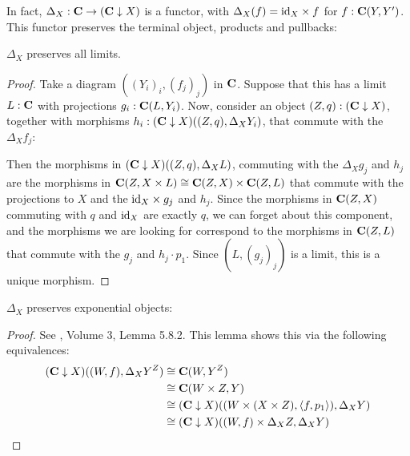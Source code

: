 In fact, $ \Delta_X : \mathbf{C} \to (\mathbf{C} \downarrow X) $ is a functor, with $ \Delta_X(f) = \text{id}_{X} \times f $ for $ f: \mathbf{C}(Y, Y^\prime) $. This functor preserves the terminal object, products and pullbacks:
\begin{lemma}\label{lem:delta-limits}
  $ \Delta_X $ preserves all limits.
\end{lemma}
\begin{proof}
  Take a diagram $ ((Y_i)_i, (f_j)_j) $ in $ \mathbf{C} $. Suppose that this has a limit $ L : \mathbf{C} $ with projections $ g_i : \mathbf{C}(L, Y_i) $. Now, consider an object $ (Z, q) : (\mathbf{C} \downarrow X) $, together with morphisms $ h_i : (\mathbf{C} \downarrow X)((Z, q), \Delta_X Y_i) $, that commute with the $ \Delta_X f_j $:
  \begin{center}
  \end{center}
  Then the morphisms in $ (\mathbf{C} \downarrow X)((Z, q), \Delta_X L) $, commuting with the $ \Delta_X g_j $ and $ h_j $ are the morphisms in $ \mathbf{C}(Z, X \times L) \cong \mathbf{C}(Z, X) \times \mathbf{C}(Z, L) $ that commute with the projections to $ X $ and the $ \text{id}_{X} \times g_j $ and $ h_j $. Since the morphisms in $ \mathbf{C}(Z, X) $ commuting with $ q $ and $ \text{id}_{X} $ are exactly $ q $, we can forget about this component, and the morphisms we are looking for correspond to the morphisms in $ \mathbf{C}(Z, L) $ that commute with the $ g_j $ and $ h_j \cdot p_1 $. Since $ (L, (g_j)_j) $ is a limit, this is a unique morphism.
\end{proof}

\begin{lemma}\label{lem:delta-exponentials}
  $ \Delta_X $ preserves exponential objects:
\end{lemma}
\begin{proof}
  See \autocite{borceux}, Volume 3, Lemma 5.8.2. This lemma shows this via the following equivalences:
  \begin{align*}
    (\mathbf{C} \downarrow X)((W, f), \Delta_X Y^Z) &\cong \mathbf{C}(W, Y^Z)\\
    &\cong \mathbf{C}(W \times Z, Y)\\
    &\cong (\mathbf{C} \downarrow X)((W \times (X \times Z), \langle f, p_1 \rangle), \Delta_X Y)\\
    &\cong (\mathbf{C} \downarrow X)((W, f) \times \Delta_X Z, \Delta_X Y)\\
  \end{align*}
\end{proof}

